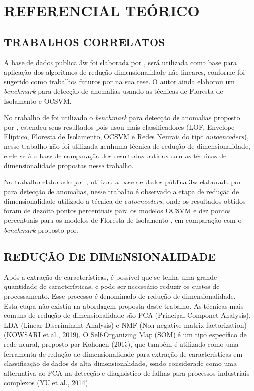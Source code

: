 \chapter[REFERENCIAL TEÓRICO]{REFERENCIAL TEÓRICO} \label{cap:referencial}

\section{TRABALHOS CORRELATOS}

A base de dados publica 3w foi elaborada por \cite{vargas2019base}, será utilizada como base para aplicação dos algoritmos de redução dimensionalidade não lineares, conforme foi sugerido como trabalhos futuros por \cite{vargas2019base} na sua tese. O autor ainda elaborou um
\textit{benchmark} para detecção de anomalias usando as técnicas de Floresta de Isolamento e OCSVM.

No trabalho de \cite{fernandes2022comparaccao} foi  utilizado o \textit{benchmark} para detecção de anomalias proposto por \cite{vargas2019base}, estendeu seus resultados pois usou mais classificadores (LOF, Envelope Elíptico, Floresta de Isolamento, OCSVM e Redes Neurais do tipo \textit{autoencoders}), nesse trabalho não foi utilizada nenhuma técnica de redução de dimensionalidade, e ele será a base de comparação dos resultados obtidos com as técnicas de dimensionalidade propostas nesse trabalho.

No trabalho elaborado por \cite{rodrigo2021}, utilizou a base de dados pública 3w elaborada por \cite{vargas2019base} para detecção de anomalias, nesse trabalho é observado a etapa de redução de dimensionalidade utilizado a técnica de \textit{autoencoders}, onde os resultados obtidos foram de dezoito pontos percentuais para os modelos OCSVM e dez pontos percentuais para os modelos de Floresta de Isolamento \cite{rodrigo2021},  em comparação com o \textit{benchmark} proposto por\cite{vargas2019base}.




\section{REDUÇÃO DE DIMENSIONALIDADE}

Após a extração de características, é possível que se tenha uma grande quantidade de características, e pode ser necessário reduzir os custos de processamento. Esse processo é denominado de redução de dimensionalidade. Esta etapa não existiu na abordagem proposta
deste trabalho.
As técnicas mais comuns de redução de dimensionalidade são PCA (Principal Componet Analysis), LDA (Linear Discriminant Analysis) e NMF (Non-negative matrix factorization) (KOWSARI et al., 2019). O Self-Organizing Map (SOM) é um tipo específico de rede neural,
proposto por Kohonen (2013), que também é utilizado como uma ferramenta de redução de
dimensionalidade para extração de características em classificação de dados de alta
dimensionalidade, sendo considerado como uma alternativa ao PCA na detecção e diagnóstico
de falhas para processos industriais complexos (YU et al., 2014).

